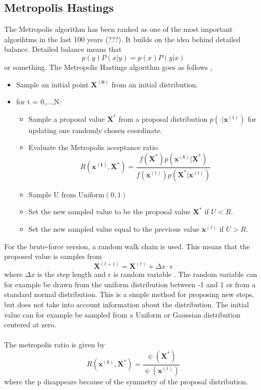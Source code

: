 \subsection{Metropolis Hastings}
The Metropolis algorithm has been ranked as one of the most important algorihtms in the last 100 years (???). It builds on the idea behind detailed balance. Detailed balance means that
\begin{equation}
    p(y)P(x|y) = p(x)P(y|x)
\end{equation}
or something. 
The Metropolis Hastings algorithm goes as follows \cite{compstat},
\begin{itemize}
    \item Sample an initial point $\boldsymbol{X^{(0)}}$ from an initial distribution. 
    \item for t = 0,...,N:
    \begin{itemize}
        \item Sample a proposal value $\boldsymbol{X^*}$ from a proposal distribution $p(\cdot | \boldsymbol{x}^{(t)})$ for updating one randomly chosen coordinate.
        \item Evaluate the Metropolis acceptance ratio 
        \begin{equation}
            R(\boldsymbol{x^{(t)}, \boldsymbol{X}^*}) = \frac{f(\boldsymbol{X}^*)p(\boldsymbol{x^{(t)}}|\boldsymbol{X}^*)}{f(\boldsymbol{x}^{(t)})p(\boldsymbol{X}^*|\boldsymbol{x}^{(t)})}
        \end{equation}
        \item Sample U from $\text{Uniform}(0,1)$
        \item Set the new sampled value to be the proposal value $\boldsymbol{X}^*$ if $U < R$.
        \item Set the new sampled value equal to the previous value $\boldsymbol{x}^{(t)}$ if $U > R$.
    \end{itemize}
\end{itemize}
For the brute-force version, a random walk chain is used. This means that the proposed value is samples from
\begin{equation}
    \boldsymbol{X}^{(t+1)} = \boldsymbol{X}^{(t)} + \Delta x\cdot\epsilon
\end{equation}
where $\Delta x$ is the step length and $\epsilon$ is random variable \cite{compstat}. The random variable can for example be drawn from the uniform distribution between -1 and 1 or from a standard normal distribution. This is a simple method for proposing new steps, but does not take into account information about the distribution. The initial value can for example be sampled from a Uniform or Gaussian distribution centered at zero.  
\\
\\
The metropolis ratio is given by
\begin{equation}
    R(\boldsymbol{x^{(t)}, \boldsymbol{X}^*}) = \frac{\uppsi(\boldsymbol{X}^*)}{\uppsi(\boldsymbol{x}^{(t)})}
\end{equation}
where the p disappears because of the symmetry of the proposal distribution. 


